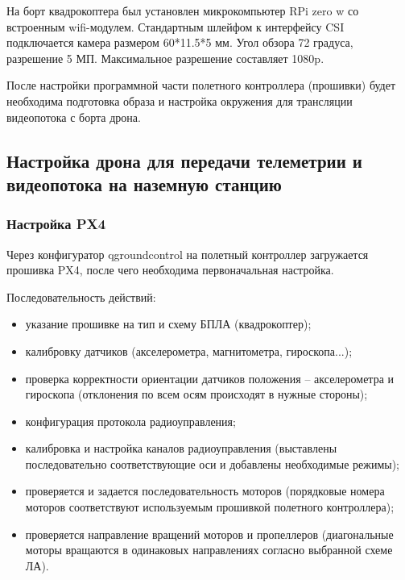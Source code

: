 На борт квадрокоптера был установлен микрокомпьютер RPi zero w со встроенным wifi-модулем. Стандартным шлейфом к интерфейсу CSI подключается камера размером 60*11.5*5 мм. Угол обзора 72 градуса, разрешение 5 МП. Максимальное разрешение составляет 1080p. 

После настройки программной части полетного контроллера (прошивки) будет необходима подготовка образа и настройка окружения для трансляции видеопотока с борта дрона.


\subsection{Настройка дрона для передачи телеметрии и видеопотока на наземную станцию}


\subsubsection{Настройка PX4}
Через конфигуратор qgroundcontrol на полетный контроллер загружается прошивка PX4, после чего необходима первоначальная настройка.

Последовательность действий:
\begin{itemize}
	\item указание прошивке на тип и схему БПЛА (квадрокоптер);
	\item калибровку датчиков (акселерометра, магнитометра, гироскопа...);
	\item проверка корректности ориентации датчиков положения -- акселерометра и гироскопа (отклонения по всем осям происходят в нужные стороны);
	\item конфигурация протокола радиоуправления;
	\item калибровка и настройка каналов радиоуправления (выставлены последовательно соответствующие оси и добавлены необходимые режимы);
	\item проверяется и задается последовательность моторов (порядковые номера моторов соответствуют используемым прошивкой полетного контроллера);
	\item проверяется направление вращений моторов и пропеллеров (диагональные моторы вращаются в одинаковых направлениях согласно выбранной схеме ЛА).
\end{itemize}

